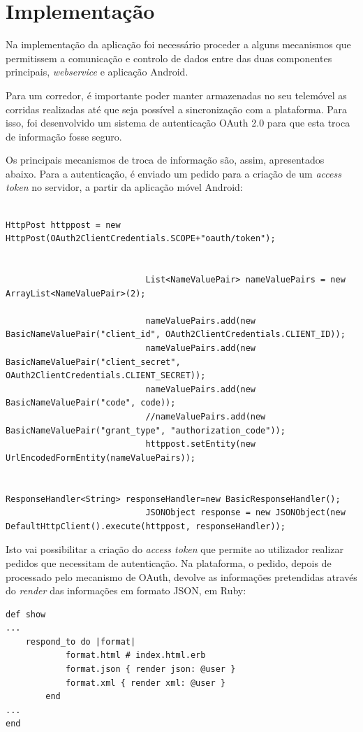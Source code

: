 \documentclass[15pt,a4paper]{article}
\begin{document}
\section{Implementação}

Na implementação da aplicação foi necessário proceder a alguns mecanismos que permitissem a comunicação e controlo de dados entre das duas componentes principais, \textit{webservice} e aplicação Android. 

Para um corredor, é importante poder manter armazenadas no seu telemóvel as corridas realizadas até que seja possível a sincronização com a plataforma. Para isso, foi desenvolvido um sistema de autenticação OAuth 2.0 para que esta troca de informação fosse seguro. 

Os principais mecanismos de troca de informação são, assim, apresentados abaixo. Para a autenticação, é enviado um pedido para a criação de um \textit{access token} no servidor, a partir da aplicação móvel Android:

\begin{verbatim}
	
HttpPost httppost = new HttpPost(OAuth2ClientCredentials.SCOPE+"oauth/token");
							
							
							List<NameValuePair> nameValuePairs = new ArrayList<NameValuePair>(2);

							nameValuePairs.add(new BasicNameValuePair("client_id", OAuth2ClientCredentials.CLIENT_ID));
							nameValuePairs.add(new BasicNameValuePair("client_secret", OAuth2ClientCredentials.CLIENT_SECRET));
							nameValuePairs.add(new BasicNameValuePair("code", code));
							//nameValuePairs.add(new BasicNameValuePair("grant_type", "authorization_code"));
							httppost.setEntity(new UrlEncodedFormEntity(nameValuePairs));


ResponseHandler<String> responseHandler=new BasicResponseHandler();
							JSONObject response = new JSONObject(new DefaultHttpClient().execute(httppost, responseHandler));

\end{verbatim}

Isto vai possibilitar a criação do \textit{access token} que permite ao utilizador realizar pedidos que necessitam de autenticação. Na plataforma, o pedido, depois de processado pelo mecanismo de OAuth, devolve as informações pretendidas através do \textit{render} das informações em formato JSON, em Ruby:

\begin{verbatim}
def show
...
	respond_to do |format|
      		format.html # index.html.erb
      		format.json { render json: @user }
      		format.xml { render xml: @user }
    	end
...
end
\end{verbatim}
\end{document}
